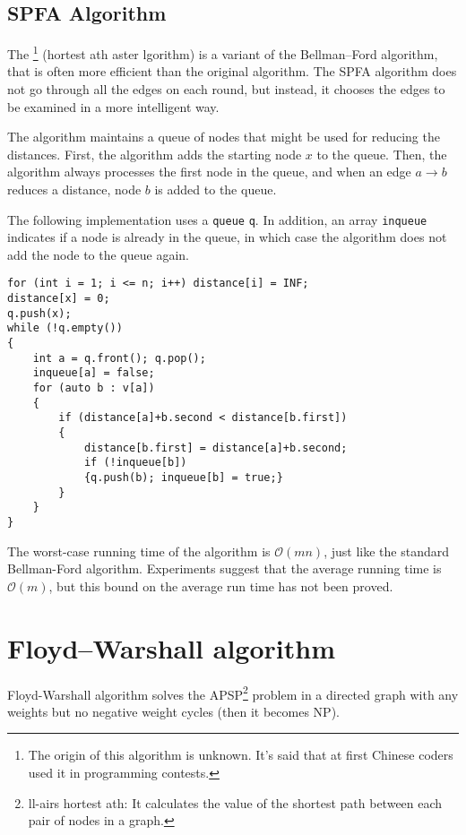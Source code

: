 \documentclass[twoside,12pt,a4paper,english]{book}
\theoremstyle{definition}
\theoremstyle{problemstyle}
\begin{document}
\section{SPFA Algorithm}

The \footnote{The origin of this algorithm is unknown. It's said that at first Chinese coders used it in programming contests.} (hortest ath aster lgorithm)
is a variant of the Bellman–Ford algorithm,
that is often more efficient than the original algorithm.
The SPFA algorithm does not go through all the edges on each round,
but instead, it chooses the edges to be examined
in a more intelligent way.

The algorithm maintains a queue of nodes that might
be used for reducing the distances.
First, the algorithm adds the starting node $x$
to the queue.
Then, the algorithm always processes the
first node in the queue, and when an edge
$a \rightarrow b$ reduces a distance,
node $b$ is added to the queue.

The following implementation uses a 
\texttt{queue} \texttt{q}.
In addition, an array \texttt{inqueue} indicates
if a node is already in the queue,
in which case the algorithm does not add
the node to the queue again.

\begin{lstlisting}
for (int i = 1; i <= n; i++) distance[i] = INF;
distance[x] = 0;
q.push(x);
while (!q.empty()) 
{
    int a = q.front(); q.pop();
    inqueue[a] = false;
    for (auto b : v[a]) 
    {
        if (distance[a]+b.second < distance[b.first])
        {
            distance[b.first] = distance[a]+b.second;
            if (!inqueue[b]) 
            {q.push(b); inqueue[b] = true;}
        }
    }
}
\end{lstlisting}

The worst-case running time of the algorithm is $\mathcal{O}(mn)$, just like the standard Bellman-Ford algorithm. Experiments suggest that the average running time is $\mathcal{O}(m)$, but this bound on the average run time has not been proved.

\chapter{Floyd–Warshall algorithm}

Floyd-Warshall algorithm solves the APSP\footnote{ll-airs hortest ath: It calculates the value of the shortest path between each pair of nodes in a graph.} problem in a directed graph with any weights but no negative weight cycles (then it becomes NP).
\end{document}
